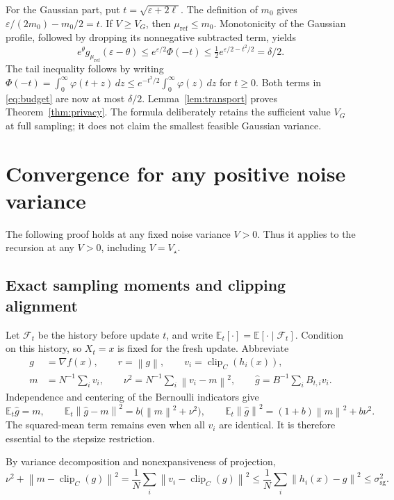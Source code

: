 \documentclass[11pt]{article}
\newcommand{\E}{\mathbb E}
\newcommand{\norm}[1]{\left\lVert #1\right\rVert}
\newcommand{\clip}{\operatorname{clip}}
\newcommand{\sg}{\mathrm{sg}}
\begin{document}
For the Gaussian part, put $t=\sqrt{\varepsilon+2\ell}$. The definition
of $m_0$ gives $\varepsilon/(2m_0)-m_0/2=t$.
If $V\ge V_G$, then $\mu_{\mathrm{ref}}\le m_0$. Monotonicity of the Gaussian profile,
followed by dropping its nonnegative subtracted term, yields
\[
 e^\theta g_{\mu_{\mathrm{ref}}}(\varepsilon-\theta)
 \le e^{\varepsilon/2}\Phi(-t)
 \le\tfrac12 e^{\varepsilon/2-t^2/2}=\delta/2.
\]
The tail inequality follows by writing
$\Phi(-t)=\int_0^\infty\varphi(t+z)\,dz
\le e^{-t^2/2}\int_0^\infty\varphi(z)\,dz$ for $t\ge0$.
Both terms in \eqref{eq:budget} are now at most $\delta/2$.
Lemma~\ref{lem:transport} proves Theorem~\ref{thm:privacy}.
The formula deliberately retains the sufficient value $V_G$ at full
sampling; it does not claim the smallest feasible Gaussian variance.

\section{Convergence for any positive noise variance}\label{sec:utility-proof}
The following proof holds at any fixed noise variance $V>0$.
Thus it applies to the recursion at any $V>0$, including $V=V_\star$.

\subsection{Exact sampling moments and clipping alignment}
Let $\mathcal F_t$ be the history before update $t$, and write
$\E_t[\cdot]=\E[\cdot\mid\mathcal F_t]$.
Condition on this history, so $X_t=x$ is fixed for the fresh update. Abbreviate
\begin{align*}
 g&=\nabla f(x),\qquad r=\norm g,\qquad v_i=\clip_C(h_i(x)),\\
 m&=N^{-1}\sum_i v_i,\qquad \nu^2=N^{-1}\sum_i\norm{v_i-m}^2,
 \qquad \widehat g=B^{-1}\sum_i B_{t,i}v_i.
\end{align*}
Independence and centering of the Bernoulli indicators give
\begin{equation}\label{eq:poisson}
 \E_t\widehat g=m,\qquad
 \E_t\norm{\widehat g-m}^2=b\bigl(\norm m^2+\nu^2\bigr),\qquad
 \E_t\norm{\widehat g}^2=(1+b)\norm m^2+b\nu^2.
\end{equation}
The squared-mean term remains even when all $v_i$ are identical.
It is therefore essential to the stepsize restriction.

By variance decomposition and nonexpansiveness of projection,
\begin{equation}\label{eq:clip-moments}
 \nu^2+\norm{m-\clip_C(g)}^2
 =\frac1N\sum_i\norm{v_i-\clip_C(g)}^2
 \le\frac1N\sum_i\norm{h_i(x)-g}^2\le\sigma_{\sg}^2.
\end{equation}
\end{document}
